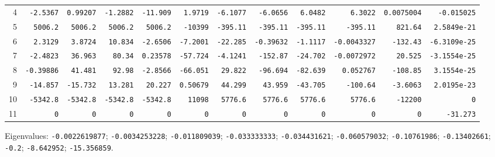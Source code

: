 \begin{landscape}
\begin{tabular}{rrrrrrrrrrrr}
4 & \texttt{-2.5367} & \texttt{0.99207} & \texttt{-1.2882} & \texttt{-11.909} & \texttt{1.9719} & \texttt{-6.1077} & \texttt{-6.0656} & \texttt{6.0482} & \texttt{6.3022} & \texttt{0.0075004} & \texttt{-0.015025} \\

5 & \texttt{5006.2} & \texttt{5006.2} & \texttt{5006.2} & \texttt{5006.2} & \texttt{-10399} & \texttt{-395.11} & \texttt{-395.11} & \texttt{-395.11} & \texttt{-395.11} & \texttt{821.64} & \texttt{2.5849e-21} \\

6 & \texttt{2.3129} & \texttt{3.8724} & \texttt{10.834} & \texttt{-2.6506} & \texttt{-7.2001} & \texttt{-22.285} & \texttt{-0.39632} & \texttt{-1.1117} & \texttt{-0.0043327} & \texttt{-132.43} & \texttt{-6.3109e-25} \\

7 & \texttt{-2.4823} & \texttt{36.963} & \texttt{80.34} & \texttt{0.23578} & \texttt{-57.724} & \texttt{-4.1241} & \texttt{-152.87} & \texttt{-24.702} & \texttt{-0.0072972} & \texttt{20.525} & \texttt{-3.1554e-25} \\

8 & \texttt{-0.39886} & \texttt{41.481} & \texttt{92.98} & \texttt{-2.8566} & \texttt{-66.051} & \texttt{29.822} & \texttt{-96.694} & \texttt{-82.639} & \texttt{0.052767} & \texttt{-108.85} & \texttt{3.1554e-25} \\

9 & \texttt{-14.857} & \texttt{-15.732} & \texttt{13.281} & \texttt{20.227} & \texttt{0.50679} & \texttt{44.299} & \texttt{43.959} & \texttt{-43.705} & \texttt{-100.64} & \texttt{-3.6063} & \texttt{2.0195e-23} \\

10 & \texttt{-5342.8} & \texttt{-5342.8} & \texttt{-5342.8} & \texttt{-5342.8} & \texttt{11098} & \texttt{5776.6} & \texttt{5776.6} & \texttt{5776.6} & \texttt{5776.6} & \texttt{-12200} & \texttt{0} \\

11 & \texttt{0} & \texttt{0} & \texttt{0} & \texttt{0} & \texttt{0} & \texttt{0} & \texttt{0} & \texttt{0} & \texttt{0} & \texttt{0} & \texttt{-31.273} \\

\bottomrule\end{tabular}\par\endgroup

{\scriptsize Eigenvalues: \texttt{-0.0022619877}; \texttt{-0.0034253228}; \texttt{-0.011809039}; \texttt{-0.033333333}; \texttt{-0.034431621}; \texttt{-0.060579032}; \texttt{-0.10761986}; \texttt{-0.13402661}; \texttt{-0.2}; \texttt{-8.642952}; \texttt{-15.356859}.\par}


\end{landscape}
